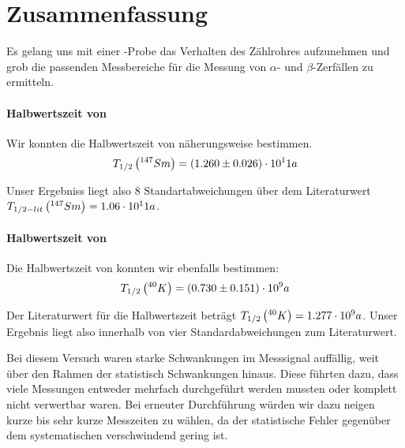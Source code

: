 \section{Zusammenfassung}

Es gelang uns mit einer -Probe das Verhalten des Zählrohres aufzunehmen und grob die passenden Messbereiche für die Messung von $\alpha$- und $\beta$-Zerfällen zu ermitteln. 

\paragraph{Halbwertszeit von } Wir konnten die Halbwertszeit von  näherungsweise bestimmen.
$$
 T_{1/2} \left( ^{147}_{}{Sm} \right) = (1.260 \pm 0.026) \cdot 10^11 a
$$

Unser Ergebniss liegt also 8 Standartabweichungen über dem Literaturwert $T_{1/2 - lit} \left( ^{147}_{}{Sm} \right) = 1.06 \cdot 10^11 a$.

\paragraph{Halbwertszeit von } Die Halbwertszeit von  konnten wir ebenfalls bestimmen:
$$
  T_{1/2} \left( ^{40}_{}{K} \right) = ( 0.730 \pm 0.151 ) \cdot 10^9 a
$$

Der Literaturwert für die Halbwertszeit beträgt $T_{1/2} \left( ^{40}_{}{K} \right) = 1.277 \cdot 10^9 a$. Unser Ergebnis liegt also innerhalb von vier Standardabweichungen zum Literaturwert.

Bei diesem Versuch waren starke Schwankungen im Messsignal auffällig, weit über den Rahmen der statistisch Schwankungen hinaus. Diese führten dazu, dass viele Messungen entweder mehrfach durchgeführt werden mussten oder komplett nicht verwertbar waren. Bei erneuter Durchführung würden wir dazu neigen kurze bis sehr kurze Messzeiten zu wählen, da der statistische Fehler gegenüber dem systematischen verschwindend gering ist.

